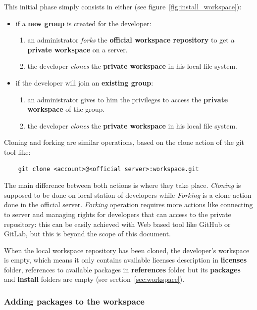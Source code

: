 \documentclass[12pt,a4paper]{article}
\begin{document}
This initial phase simply consists in either (see figure~\ref{fig:install_workspace}):
\begin{itemize}
\item if a \textbf{new group} is created for the developer:
\begin{enumerate}
\item  an administrator \textit{forks} the \textbf{official workspace repository} to get a \textbf{private workspace} on a server.
\item the developer \textit{clones} the \textbf{private workspace} in his local file system.
\end{enumerate}
\item if the developer will join an \textbf{existing group}:
\begin{enumerate}
\item  an administrator gives to him the privileges to access the \textbf{private workspace} of the group.
\item the developer \textit{clones} the \textbf{private workspace} in his local file system.
\end{enumerate}
\end{itemize}

Cloning and forking are similar operations, based on the clone action of the git tool like:
\begin{verbatim}
	git clone <account>@<official server>:workspace.git
\end{verbatim}
The main difference between both actions is where they take place. \textit{Cloning} is supposed to be done on local station of developers while \textit{Forking} is a clone action done in the official server. \textit{Forking} operation requires more actions like connecting to server and managing rights for developers that can access to the private repository: this can be easily achieved with Web based tool like GitHub or GitLab, but this is beyond the scope of this document.

When the local workspace repository has been cloned, the developer's workspace is empty, which means it only contains available licenses description in \textbf{licenses} folder, references to available packages in \textbf{references} folder but its \textbf{packages} and \textbf{install} folders are empty (see section~\ref{sec:workspace}).

\subsubsection{Adding packages to the workspace}
\end{document}
